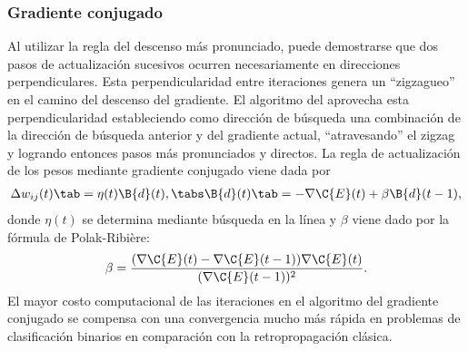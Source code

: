 %
\subsubsection{Gradiente conjugado}
%
Al utilizar la regla del descenso más pronunciado, puede demostrarse
que dos pasos de actualización sucesivos ocurren necesariamente en
direcciones perpendiculares.  Esta perpendicularidad entre iteraciones
genera un ``zigzagueo'' en el camino del descenso del gradiente. El
algoritmo del  aprovecha esta perpendicularidad
estableciendo como dirección de búsqueda una combinación de la
dirección de búsqueda anterior y del gradiente actual, ``atravesando''
el zigzag y logrando entonces pasos más pronunciados y directos.  La
regla de actualización de los pesos mediante gradiente conjugado viene
dada por
%
\begin{align}\label{e2:delta-rule-conjugate}
  \Delta w_{ij}(t)\tab=\eta(t)\B{d}(t), \tabs
  \B{d}(t)\tab=-\nabla{\C{E}(t)}+\beta\B{d}(t-1),
\end{align}
%
donde $\eta(t)$ se determina mediante búsqueda en la línea y $\beta$
viene dado por la fórmula de Polak-Ribière:
%
\begin{align}\label{e2:polak-ribiere}
  \beta=
  \frac{(\nabla{\C{E}(t)}-\nabla{\C{E}(t-1)})\nabla{\C{E}(t)}}{(\nabla{\C{E}(t-1)})^2}.
\end{align}
%
El mayor costo computacional de las iteraciones en el algoritmo del
gradiente conjugado se compensa con una convergencia mucho más rápida
en problemas de clasificación binarios en comparación con la
retropropagación clásica.
